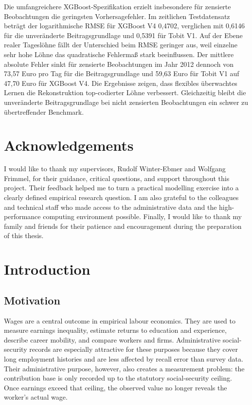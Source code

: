 \documentclass[12pt,a4paper,oneside,titlepage]{book}
\begin{document}
Die umfangreichere XGBoost-Spezifikation erzielt insbesondere für zensierte Beobachtungen die geringsten Vorhersagefehler. Im zeitlichen Testdatensatz beträgt der logarithmische RMSE für XGBoost V4 0,4702, verglichen mit 0,6146 für die unveränderte Beitragsgrundlage und 0,5391 für Tobit V1. Auf der Ebene realer Tageslöhne fällt der Unterschied beim RMSE geringer aus, weil einzelne sehr hohe Löhne das quadratische Fehlermaß stark beeinflussen. Der mittlere absolute Fehler sinkt für zensierte Beobachtungen im Jahr 2012 dennoch von 73,57 Euro pro Tag für die Beitragsgrundlage und 59,63 Euro für Tobit V1 auf 47,70 Euro für XGBoost V4. Die Ergebnisse zeigen, dass flexibles überwachtes Lernen die Rekonstruktion top-codierter Löhne verbessert. Gleichzeitig bleibt die unveränderte Beitragsgrundlage bei nicht zensierten Beobachtungen ein schwer zu übertreffender Benchmark.

\chapter*{Acknowledgements}
I would like to thank my supervisors, Rudolf Winter-Ebmer and Wolfgang Frimmel, for their guidance, critical questions, and support throughout this project. Their feedback helped me to turn a practical modelling exercise into a clearly defined empirical research question. I am also grateful to the colleagues and technical staff who made access to the administrative data and the high-performance computing environment possible. Finally, I would like to thank my family and friends for their patience and encouragement during the preparation of this thesis.

\tableofcontents
\listoffigures
\listoftables

\mainmatter

\chapter{Introduction}
\label{ch:introduction}

\section{Motivation}
Wages are a central outcome in empirical labour economics. They are used to measure earnings inequality, estimate returns to education and experience, describe career mobility, and compare workers and firms. Administrative social-security records are especially attractive for these purposes because they cover long employment histories and are less affected by recall error than survey data. Their administrative purpose, however, also creates a measurement problem: the contribution base is only recorded up to the statutory social-security ceiling. Once earnings exceed that ceiling, the observed value no longer reveals the worker's actual wage.
\end{document}
